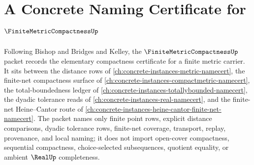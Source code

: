 \chapter{A Concrete Naming Certificate for $\FiniteMetricCompactnessUp$}
\label{ch:concrete-instances-finite-metric-compactness-namecert}

Following Bishop and Bridges and Kelley, the $\FiniteMetricCompactnessUp$ packet records the elementary compactness certificate for a finite metric carrier. It sits between the distance rows of \autoref{ch:concrete-instances-metric-namecert}, the finite-net compactness surface of \autoref{ch:concrete-instances-compactmetric-namecert}, the total-boundedness ledger of \autoref{ch:concrete-instances-totallybounded-namecert}, the dyadic tolerance reads of \autoref{ch:concrete-instances-real-namecert}, and the finite-net Heine--Cantor route of \autoref{ch:concrete-instances-heine-cantor-finite-net-namecert}. The packet names only finite point rows, explicit distance comparisons, dyadic tolerance rows, finite-net coverage, transport, replay, provenance, and local naming; it does not import open-cover compactness, sequential compactness, choice-selected subsequences, quotient equality, or ambient $\RealUp$ completeness.

